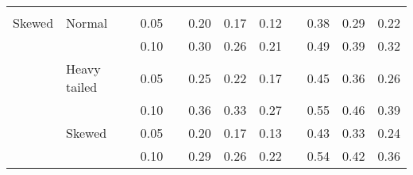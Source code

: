 \begin{table}[ht]
\begin{scriptsize}
\begin{tabular}{ll p{.1cm} c p{.1cm} rrr p{.1cm} rrr}
             &&&&&&&&&&&\\
Skewed       & Normal       && 0.05 &&  0.20 & 0.17 & 0.12 && 0.38 & 0.29 & 0.22 \\ 
             &              && 0.10 &&  0.30 & 0.26 & 0.21 && 0.49 & 0.39 & 0.32 \\ 
             & Heavy tailed && 0.05 &&  0.25 & 0.22 & 0.17 && 0.45 & 0.36 & 0.26 \\ 
             &              && 0.10 &&  0.36 & 0.33 & 0.27 && 0.55 & 0.46 & 0.39 \\ 
             & Skewed       && 0.05 &&  0.20 & 0.17 & 0.13 && 0.43 & 0.33 & 0.24 \\ 
             &              && 0.10 &&  0.29 & 0.26 & 0.22 && 0.54 & 0.42 & 0.36 \\
\hline
\end{tabular}
\end{scriptsize}
\end{table}

